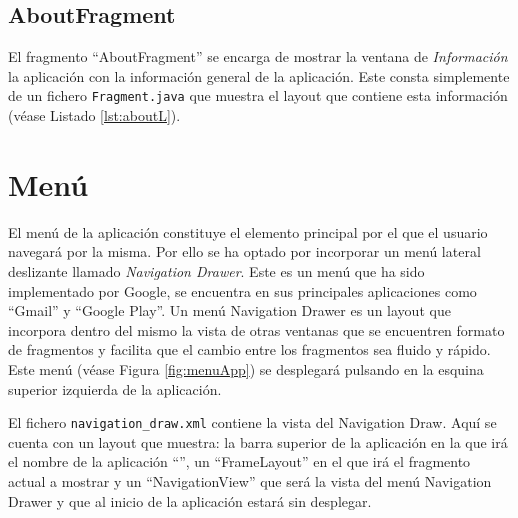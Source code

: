 


  


\subsection{AboutFragment}

El fragmento ``AboutFragment'' se encarga de mostrar la ventana de \textit{Información} la aplicación con la información general de la aplicación. Este consta simplemente de un fichero \texttt{Fragment.java} que muestra el layout que contiene esta información (véase Listado \ref{lst:aboutL}).



\section{Menú}

El menú de la aplicación constituye el elemento principal por el que el usuario navegará por la misma. Por ello se ha optado por incorporar un menú lateral deslizante llamado \textit{Navigation Drawer}. Este es un menú que ha sido implementado por Google, se encuentra en sus principales aplicaciones como ``Gmail'' y ``Google Play''. Un menú Navigation Drawer es un layout que incorpora dentro del mismo la vista de otras ventanas que se encuentren formato de fragmentos y facilita que el cambio entre los fragmentos sea fluido y rápido. Este menú (véase Figura \ref{fig:menuApp}) se desplegará pulsando en la esquina superior izquierda de la aplicación.
   
El fichero \texttt{navigation\_draw.xml} contiene la vista del Navigation Draw. Aquí se cuenta con un layout que muestra: la barra superior de la aplicación en la que irá el nombre de la aplicación ``\ULLAR{}'', un ``FrameLayout'' en el que irá el fragmento actual a mostrar y un ``NavigationView'' que será la vista del menú Navigation Drawer y que al inicio de la aplicación estará sin desplegar.

